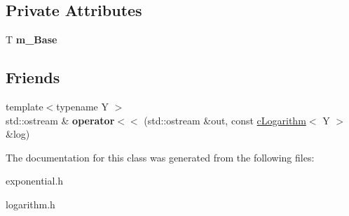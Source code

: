 \subsection*{Private Attributes}
\begin{DoxyCompactItemize}
\item 
\hypertarget{classcLogarithm_a1f47c4908f14d679d5498d5ff09565c9}{T {\bfseries m\-\_\-\-Base}}\label{classcLogarithm_a1f47c4908f14d679d5498d5ff09565c9}

\end{DoxyCompactItemize}
\subsection*{Friends}
\begin{DoxyCompactItemize}
\item 
\hypertarget{classcLogarithm_acf7e5002559bab3625c3bfe18a420dd9}{{\footnotesize template$<$typename Y $>$ }\\std\-::ostream \& {\bfseries operator$<$$<$} (std\-::ostream \&out, const \hyperlink{classcLogarithm}{c\-Logarithm}$<$ Y $>$ \&log)}\label{classcLogarithm_acf7e5002559bab3625c3bfe18a420dd9}

\end{DoxyCompactItemize}


The documentation for this class was generated from the following files\-:\begin{DoxyCompactItemize}
\item 
exponential.\-h\item 
logarithm.\-h\end{DoxyCompactItemize}
